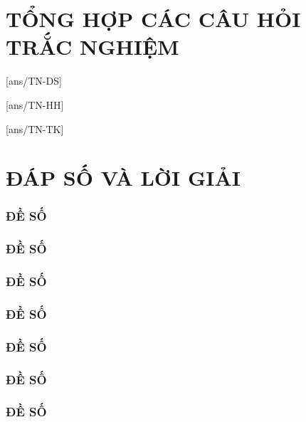 \part{TỔNG HỢP CÁC CÂU HỎI TRẮC NGHIỆM}
 	\setcounter{section}{0}
	\setcounter{section}{0}
		[ans/TN-DS] %
	  	
		[ans/TN-HH] %
	  	
		[ans/TN-TK] %
	  	


\part{ĐÁP SỐ VÀ LỜI GIẢI}
         \setcounter{section}{0}
	\setcounter{section}{0}
	\section{ĐỀ SỐ \thesection} 
	
	\section{ĐỀ SỐ \thesection} 
	
	\section{ĐỀ SỐ \thesection} 
	
	\section{ĐỀ SỐ \thesection} 
	
	\section{ĐỀ SỐ \thesection}
	
	\section{ĐỀ SỐ \thesection} 
	
 	\section{ĐỀ SỐ \thesection} 
	
